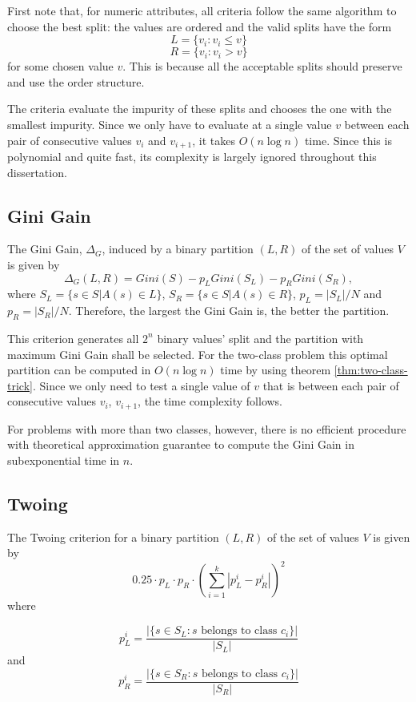 First note that, for numeric attributes, all criteria follow the same algorithm to choose the best split: the values are ordered and the valid splits have the form 
$$L = \{v_i : v_i \leq v\}$$
$$R = \{v_i : v_i > v\}$$
for some chosen value $v$. This is because all the acceptable splits should preserve and use the order structure.

The criteria evaluate the impurity of these splits and chooses the one with the smallest impurity. Since we only have to evaluate at a single value $v$ between each pair of consecutive values $v_i$ and $v_{i+1}$, it takes $O(n \log n)$ time. Since this is polynomial and quite fast, its complexity is largely ignored throughout this dissertation.

\subsection{Gini Gain}

The Gini Gain, $\Delta_G$, induced by a binary partition $(L,R)$ of the set of values $V$ is given by 
\begin{equation}
 \Delta_G (L,R) = Gini(S) -
p_L Gini(S_L) - p_R Gini(S_R),
\label{eq:Ginigain}
\end{equation}
where $S_L= \{ s \in S | A(s) \in L \}$, $S_R= \{ s \in S | A(s) \in R \}$,
 $p_L=|S_L| /N $
and $p_R=|S_R| /N$. Therefore, the largest the Gini Gain is, the better the partition.

This criterion generates all $2^n$ binary values' split and the partition with maximum Gini Gain shall be selected.
For the two-class problem this optimal partition can be computed  in $O(n \log n)$ time by using theorem \ref{thm:two-class-trick}. Since we only need to test a single value of $v$ that is between each pair of consecutive values $v_i$, $v_{i+1}$, the time complexity follows.

For problems with more than two classes, however, there is no efficient procedure with theoretical approximation guarantee to compute the Gini Gain in subexponential time in $n$.

\subsection{Twoing}
The Twoing criterion
for a  binary partition $(L,R)$ 
of the set of values $V$ is given by
$$ 0.25 \cdot p_L \cdot p_R  \cdot \left ( \sum_{i=1}^k | p_L^i - p_R^i | \right )^2$$
where

$$ p_L^i= \frac{|\{s \in S_L: s \mbox{ belongs to class } c_i \}|}{ |S_L|} $$
 and 
$$ p_R^i= \frac{|\{s \in S_R: s \mbox{ belongs to class } c_i\} |}{ |S_R|} $$

